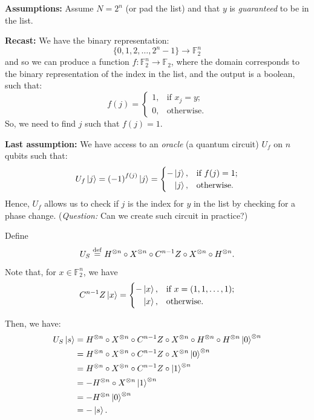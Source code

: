 \documentclass[12pt]{amsart}
\theoremstyle{plain}
\theoremstyle{definition}
\theoremstyle{remark}
\newcommand{\F}{\mathbb{F}}
\newcommand{\idef}{\overset{{\rm def}}{=}}
\begin{document}
\textbf{Assumptions:} Assume $N = 2^n$ (or pad the list) and that $y$ is \emph{guaranteed} to be in the list.

\textbf{Recast:} We have the binary representation:
\[
  \{0, 1, 2, \ldots , 2^n - 1\} \to \F_2^n
\]
and so we can produce a function $f : \F_2^n \to \F_2$, where the domain corresponds to the binary representation of the index in the list, and the output is a boolean, such that:
\[
  f(j) =
  \begin{cases}
    1,& \text{if $x_j = y$}; \\
    0,& \text{otherwise.}
  \end{cases}
\]
So, we need to find $j$ such that $f(j) = 1$.

\textbf{Last assumption:} We have access to an \emph{oracle} (a quantum circuit) $U_f$ on $n$ qubits such that:
\[
  U_f \ket{j} = {(-1)}^{f(j)} \ket{j} =
  \begin{cases}
    - \ket{j},& \text{if $f(j)=1$}; \\
    \phantom{-}\ket{j}, & \text{otherwise}.
  \end{cases}
\]
Hence, $U_f$ allows us to check if $j$ is the index for $y$ in the list by checking for a phase change.  (\emph{Question:} Can we create such circuit in practice?)

Define
\[
  U_S \idef H^{\otimes n} \circ X^{\otimes n} \circ C^{n-1}Z \circ X^{\otimes n} \circ H^{\otimes n}.
\]
Note that, for $x \in \F_2^n$, we have
\[
  C^{n-1}Z \ket{x} =
  \begin{cases}
    - \ket{x},& \text{if $x = (1, 1, \ldots , 1)$}; \\
    \phantom{-}\ket{x}, & \text{otherwise}.
  \end{cases}
\]

Then, we have:
\begin{align*}
  U_S \ket{s}
  & =  H^{\otimes n} \circ X^{\otimes n} \circ C^{n-1}Z \circ X^{\otimes n} \circ H^{\otimes n} \circ H^{\otimes n} \ket{0}^{\otimes n} \\
  & =  H^{\otimes n} \circ X^{\otimes n} \circ C^{n-1}Z \circ X^{\otimes n} \ket{0}^{\otimes n} \\
  & =  H^{\otimes n} \circ X^{\otimes n} \circ C^{n-1}Z \circ \ket{1}^{\otimes n} \\
  & =  -H^{\otimes n} \circ X^{\otimes n} \ket{1}^{\otimes n} \\
  & =  -H^{\otimes n} \ket{0}^{\otimes n} \\
  & = - \ket{s}.
\end{align*}
\end{document}
